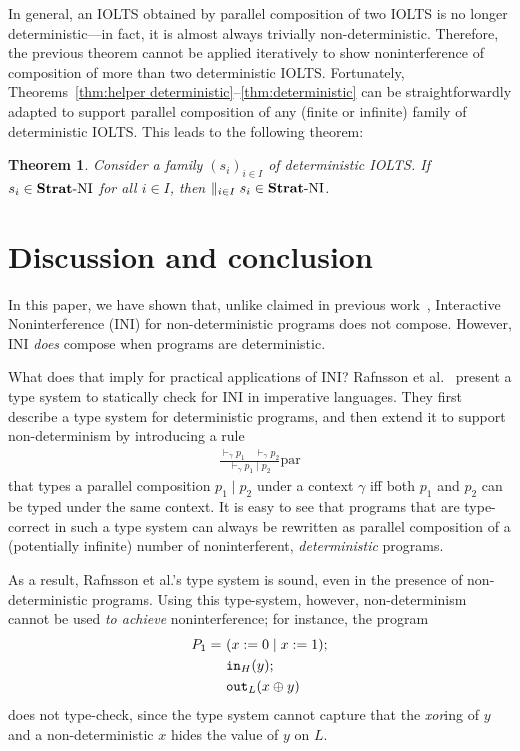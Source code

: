 \documentclass[preprint,5p,twocolumn]{elsarticle}
\newtheorem{theorem}{Theorem}
\begin{document}
In general, an IOLTS obtained by parallel composition of two IOLTS is no longer deterministic---in fact, it is almost
always trivially non-deterministic. Therefore, the previous theorem cannot be applied iteratively to show noninterference of
composition of more than two deterministic IOLTS. Fortunately, Theorems~\ref{thm:helper deterministic}--\ref{thm:deterministic}
can be straightforwardly adapted to support parallel composition of any (finite or infinite) family of deterministic IOLTS. This leads to the following theorem:
\begin{theorem}
  \label{thm:deterministic family}
  Consider a family $(s_i)_{i\in I}$ of deterministic IOLTS. If $s_i \in \mathbf{Strat}\text{-}\mathrm{NI}$ for all $i \in I$, then $\parallel_{i \in I} s_i \in \mathbf{Strat}\text{-}\mathrm{NI}$.
\end{theorem}

\section{Discussion and conclusion}

In this paper, we have shown that, unlike claimed in previous work~\cite{Rafnsson2012,Rafnsson2014}, Interactive Noninterference (INI) for non-deterministic programs does not compose. However, INI \emph{does} compose when programs are deterministic.

What does that imply for practical applications of INI? Rafnsson et al.~\cite{Rafnsson2012} present a type system to statically check for INI in imperative languages. They first describe a type system for deterministic programs, and then extend it to support non-determinism by introducing a rule
\begin{align*}
    \frac{\vdash_\gamma p_1 \quad \vdash_\gamma p_2}{\vdash_\gamma p_1 \mid p_2}\textrm{par}
\end{align*}
that types a parallel composition $p_1 \mid p_2$ under a context $\gamma$ iff both $p_1$ and $p_2$ can be typed under the same context. It is easy to see that programs that are type-correct in such a type system can always be rewritten as parallel composition of a (potentially infinite) number of noninterferent, \emph{deterministic} programs.


As a result, Rafnsson et al.'s type system is sound, even in the presence of non-deterministic programs. Using this type-system, however, non-determinism cannot be used \emph{to achieve} noninterference; for instance, the program 
\begin{align*}
  P_1=~&(x := 0 \mid x := 1);\\
  &\mathtt{in}_{H}(y);\\
  &\mathtt{out}_{L}(x \oplus y)
\end{align*}
does not type-check, since the type system cannot capture that
the \emph{xor}ing of $y$ and a non-deterministic $x$ hides the value of $y$ on $L$.
\end{document}
